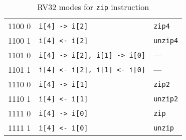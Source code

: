 \begin{table}[h]
\begin{small}
\begin{center}
\begin{tabular}{c l l}
\hline

      1100 0  & {\tt i[4] -> i[2]}               & {\tt zip4} \\
      1100 1  & {\tt i[4] <- i[2]}               & {\tt unzip4} \\
      1101 0  & {\tt i[4] -> i[2], i[1] -> i[0]} & --- \\
      1101 1  & {\tt i[4] <- i[2], i[1] <- i[0]} & --- \\
      1110 0  & {\tt i[4] -> i[1]}               & {\tt zip2} \\
      1110 1  & {\tt i[4] <- i[1]}               & {\tt unzip2} \\
      1111 0  & {\tt i[4] -> i[0]}               & {\tt zip} \\
      1111 1  & {\tt i[4] <- i[0]}               & {\tt unzip} \\
\end{tabular}
\end{center}
\end{small}
\caption{RV32 modes for {\tt zip} instruction}
\label{zip-modes}
\end{table}
